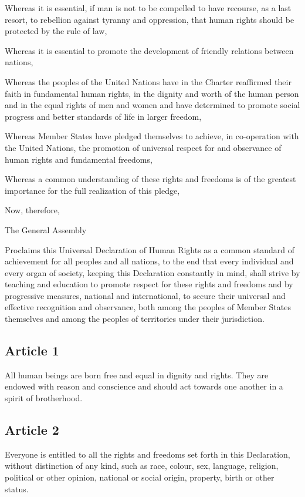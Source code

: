 \documentclass[
  titlepage,
  openright,
  DIV=calc,
  toc=listof,
  listof=nochaptergap]{scrbook}
\begin{document}
Whereas it is essential, if man is not to be compelled to have recourse,
as a last resort, to rebellion against tyranny and oppression, that
human rights should be protected by the rule of law,

Whereas it is essential to promote the development of friendly relations
between nations,

Whereas the peoples of the United Nations have in the Charter reaffirmed
their faith in fundamental human rights, in the dignity and worth of the
human person and in the equal rights of men and women and have
determined to promote social progress and better standards of life in
larger freedom,

Whereas Member States have pledged themselves to achieve, in
co-operation with the United Nations, the promotion of universal respect
for and observance of human rights and fundamental freedoms,

Whereas a common understanding of these rights and freedoms is of the
greatest importance for the full realization of this pledge,

Now, therefore,

The General Assembly

Proclaims this Universal Declaration of Human Rights as a common
standard of achievement for all peoples and all nations, to the end that
every individual and every organ of society, keeping this Declaration
constantly in mind, shall strive by teaching and education to promote
respect for these rights and freedoms and by progressive measures,
national and international, to secure their universal and effective
recognition and observance, both among the peoples of Member States
themselves and among the peoples of territories under their
jurisdiction.

\hypertarget{article-1}{%
\subsection{Article 1}\label{article-1}}

All human beings are born free and equal in dignity and rights. They are
endowed with reason and conscience and should act towards one another in
a spirit of brotherhood.

\hypertarget{article-2}{%
\subsection{Article 2}\label{article-2}}

Everyone is entitled to all the rights and freedoms set forth in this
Declaration, without distinction of any kind, such as race, colour, sex,
language, religion, political or other opinion, national or social
origin, property, birth or other status.
\end{document}
